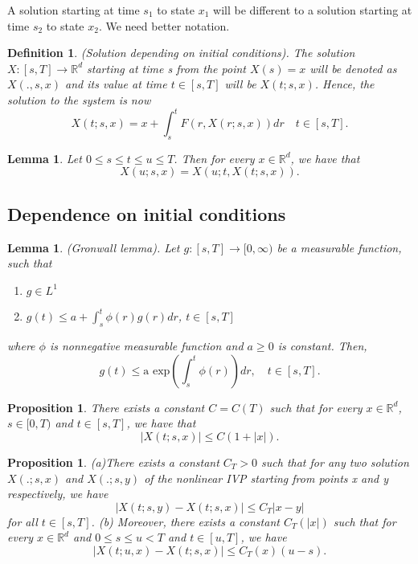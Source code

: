 \documentclass[twoside]{article}
\newtheorem{lemma}[theorem]{Lemma}
\newtheorem{proposition}[theorem]{Proposition}
\newtheorem{definition}[theorem]{Definition}
\begin{document}
A solution starting at time $s_1$ to state $x_1$ will be different to a solution starting at time $s_2$ to state $x_2$. We need better notation.

\begin{definition}(Solution depending on initial conditions). The solution $X: [s,T] \rightarrow \mathbb{R}^d$ starting at time s from the point $X(s) = x$ will be denoted as $X(.,s,x)$ and its value at time $t \in [s,T]$ will be $X(t;s,x)$. Hence, the solution to the system is now 
$$
X(t;s,x) = x + \int_{s}^tF(r, X(r;s,x))dr \quad t \in [s,T].
$$
\end{definition}

\begin{lemma}Let $0 \leq s \leq t \leq u \leq T$. Then for every $x \in \mathbb{R}^d$, we have that
$$
X(u;s,x) = X(u;t,X(t;s,x)).
$$
\end{lemma}

\subsection{Dependence on initial conditions}

\begin{lemma}(Gronwall lemma). Let $g: [s,T] \rightarrow [0, \infty)$ be a measurable function, such that 
\begin{enumerate}
\item $g \in L^1$
\item $g(t) \leq a + \int_s^t\phi(r)g(r)dr$, \quad $t \in [s,T]$
\end{enumerate}
where $\phi$ is nonnegative measurable function and $a \geq 0$ is constant. Then,
$$
g(t) \leq \text{a exp}(\int_s^t\phi(r))dr, \quad t \in [s, T].
$$
\end{lemma}

\begin{proposition}There exists a constant $C = C(T)$ such that for every $x \in \mathbb{R}^d$, $s \in [0,T)$ and $t \in [s, T]$, we have that 
$$
|X(t; s, x)| \leq C(1 + |x|).
$$
\end{proposition}

\begin{proposition}(a)There exists a constant $C_T > 0$ such that for any two solution $X(.;s,x)$ and $X(.;s,y)$ of the nonlinear IVP starting from points x and y respectively, we have 
$$
|X(t;s,y) - X(t;s,x)| \leq C_T|x-y|
$$
for all $t \in [s,T]$.
\newline
(b) Moreover, there exists a constant $C_T(|x|)$ such that for every $x \in \mathbb{R}^d$ and $0 \leq s \leq u < T$ and $t \in [u, T]$, we have 
$$
|X(t; u, x) - X(t; s, x)| \leq C_T(x)(u - s).
$$
\end{proposition}
\end{document}
